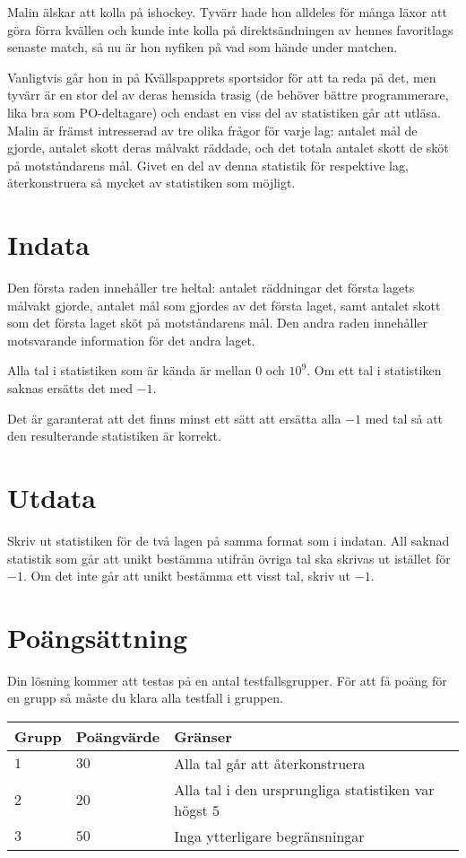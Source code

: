 Malin älskar att kolla på ishockey.
Tyvärr hade hon alldeles för många läxor att göra förra kvällen och kunde inte kolla på direktsändningen av hennes favoritlags senaste match, så nu är hon nyfiken på vad som hände under matchen.

Vanligtvis går hon in på Kvällspapprets sportsidor för att ta reda på det, men tyvärr är en stor del av deras hemsida trasig (de behöver bättre programmerare, lika bra som PO-deltagare) och endast en viss del av statistiken går att utläsa.
Malin är främst intresserad av tre olika frågor för varje lag: antalet mål de gjorde, antalet skott deras målvakt räddade, och det totala antalet skott de sköt på motståndarens mål.
Givet en del av denna statistik för respektive lag, återkonstruera så mycket av statistiken som möjligt.

\section*{Indata}
Den första raden innehåller tre heltal: antalet räddningar det första lagets målvakt gjorde, antalet mål som gjordes av det första laget, samt antalet skott som det första laget sköt på motståndarens mål.
Den andra raden innehåller motsvarande information för det andra laget.

Alla tal i statistiken som är kända är mellan $0$ och $10^9$.
Om ett tal i statistiken saknas ersätts det med $-1$.

Det är garanterat att det finns minst ett sätt att ersätta alla $-1$ med tal så att den resulterande statistiken är korrekt.

\section*{Utdata}
Skriv ut statistiken för de två lagen på samma format som i indatan.
All saknad statistik som går att unikt bestämma utifrån övriga tal ska skrivas ut istället för $-1$.
Om det inte går att unikt bestämma ett visst tal, skriv ut $-1$.

\section*{Poängsättning}
Din lösning kommer att testas på en antal testfallsgrupper.
För att få poäng för en grupp så måste du klara alla testfall i gruppen.

\noindent
\begin{tabular}{| l | l | p{12cm} |}
  \hline
  Grupp & Poängvärde & Gränser \\ \hline
  $1$   & $30$       & Alla tal går att återkonstruera \\ \hline
  $2$   & $20$       & Alla tal i den ursprungliga statistiken var högst $5$ \\ \hline
  $3$   & $50$       & Inga ytterligare begränsningar \\ \hline
\end{tabular}

